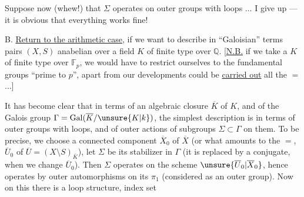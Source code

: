 Suppose now (whew!) that
\(\Sigma\) operates on outer groups with loops \(\ldots\)
I give up --- it is obvious that
everything works fine!

B. \uline{Return to the arithmetic case}, if we
want to describe in ``Galoisian'' terms
pairs \((X,S)\)  anabelian  over a field
\(K\) of finite type over \(\mathbb Q\). [\uline{N.B.} if we take
a \(K\) of finite type over \(\mathbb F_p\), we would have to
restrict ourselves to the fundamental groups ``prime to
\(p\)'', apart from  our developments could
be \uline{carried out} all the \(=\) \(\ldots\)]

It has become clear that in terms of an
algebraic closure \(\overline K\) of \(K\), and of the
 Galois group \(\Gamma=\operatorname{Gal}(\overline K/\unsure{K|k})\), the
simplest description is in
terms of outer groups with loops, and
of outer actions of  subgroups \(\Sigma\subset\Gamma\)
on them. To be precise,  we
choose a connected component
\(\overline X_0\) of \(\overline X\) (or what amounts to the \(=\),
\(\overline U_0\) of \(\overline U=(X\setminus S)_{\overline K}\)), let \(\Sigma\) be its
stabilizer in \(\Gamma\) (it is replaced
by a conjugate, when we change
\(\overline U_0\)). Then \(\Sigma\) operates on the scheme
\(\unsure{\overline U_0|\overline X_0}\), hence operates by outer automorphisms on its
\(\pi_1\) (considered as an outer group).
Now on this there is a loop
structure,  index set
